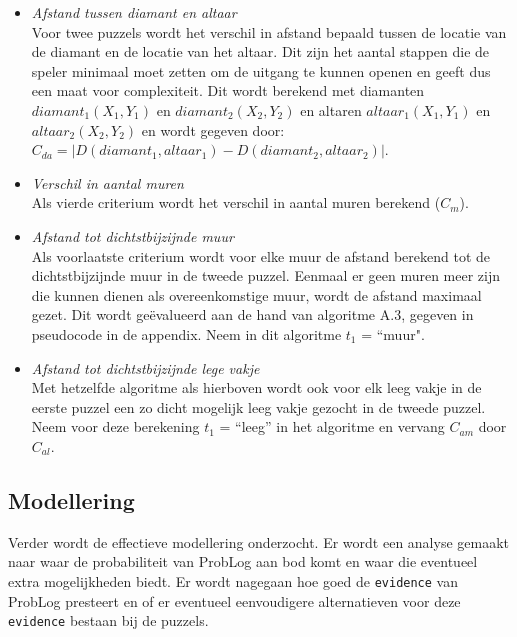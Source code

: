 \documentclass{article}
\begin{document}
\begin{itemize}
\begin{itemize}
\item \textit{Afstand tussen diamant en altaar}\\
Voor twee puzzels wordt het verschil in afstand bepaald tussen de locatie van de diamant en de locatie van het altaar. Dit zijn het aantal stappen die de speler minimaal moet zetten om de uitgang te kunnen openen en geeft dus een maat voor complexiteit.  Dit wordt berekend met diamanten $diamant_1(X_1, Y_1)$ en $diamant_2(X_2, Y_2)$ en altaren $altaar_1(X_1, Y_1)$ en $altaar_2(X_2, Y_2)$ en wordt gegeven door: $C_{da} = |D(diamant_1, altaar_1) - D(diamant_2, altaar_2)|$.
\item \textit{Verschil in aantal muren}\\
Als vierde criterium wordt het verschil in aantal muren berekend ($C_m$).
\item \textit{Afstand tot dichtstbijzijnde muur}\\
Als voorlaatste criterium wordt voor elke muur de afstand berekend tot de dichtstbijzijnde muur in de tweede puzzel. Eenmaal er geen muren meer zijn die kunnen dienen als overeenkomstige muur, wordt de afstand maximaal gezet. Dit wordt ge\"evalueerd aan de hand van algoritme A.3, gegeven in pseudocode in de appendix. Neem in dit algoritme $t_1$ = ``muur".
\item \textit{Afstand tot dichtstbijzijnde lege vakje}\\
Met hetzelfde algoritme als hierboven wordt ook voor elk leeg vakje in de eerste puzzel een zo dicht mogelijk leeg vakje gezocht in de tweede puzzel. Neem voor deze berekening $t_1$ = ``leeg'' in het algoritme en vervang $C_{am}$ door $C_{al}$.
\end{itemize}

\end{itemize}

\subsection{Modellering}
Verder wordt de effectieve modellering onderzocht. Er wordt een analyse gemaakt naar waar de probabiliteit van ProbLog aan bod komt en waar die eventueel extra mogelijkheden biedt. Er wordt nagegaan hoe goed de \texttt{evidence} van ProbLog presteert en of er eventueel eenvoudigere alternatieven voor deze \texttt{evidence} bestaan bij de puzzels.
\end{document}
